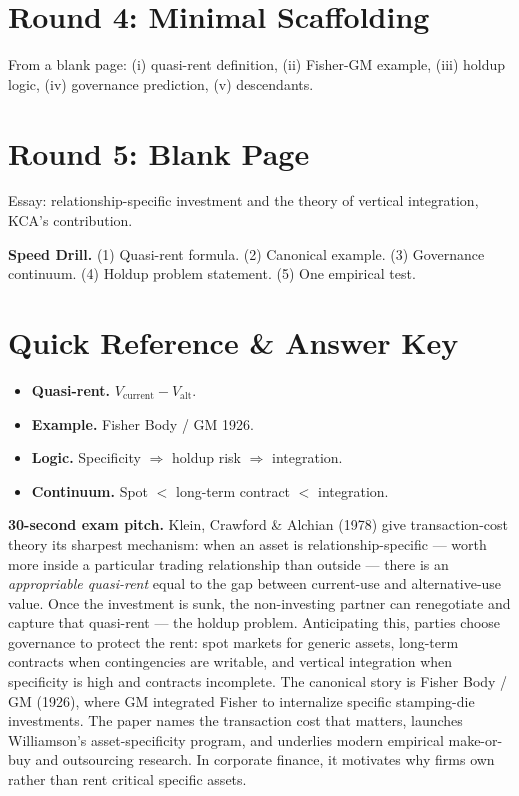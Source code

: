 \documentclass[11pt]{article}
\begin{document}
\section*{Round 4: Minimal Scaffolding}
From a blank page: (i) quasi-rent definition, (ii) Fisher-GM example, (iii) holdup logic, (iv) governance prediction, (v) descendants.

\section*{Round 5: Blank Page}
Essay: relationship-specific investment and the theory of vertical integration, KCA's contribution.

\vspace{6pt}
\begin{drillbox}
\textbf{Speed Drill.} (1) Quasi-rent formula. (2) Canonical example. (3) Governance continuum. (4) Holdup problem statement. (5) One empirical test.
\end{drillbox}

\section*{Quick Reference \& Answer Key}
\begin{answerbox}
\begin{itemize}
\item \textbf{Quasi-rent.} $V_{\text{current}} - V_{\text{alt}}$.
\item \textbf{Example.} Fisher Body / GM 1926.
\item \textbf{Logic.} Specificity $\Rightarrow$ holdup risk $\Rightarrow$ integration.
\item \textbf{Continuum.} Spot $<$ long-term contract $<$ integration.
\end{itemize}
\end{answerbox}

\begin{keybox}
\textbf{30-second exam pitch.} Klein, Crawford \& Alchian (1978) give transaction-cost theory its sharpest mechanism: when an asset is relationship-specific --- worth more inside a particular trading relationship than outside --- there is an \emph{appropriable quasi-rent} equal to the gap between current-use and alternative-use value. Once the investment is sunk, the non-investing partner can renegotiate and capture that quasi-rent --- the holdup problem. Anticipating this, parties choose governance to protect the rent: spot markets for generic assets, long-term contracts when contingencies are writable, and vertical integration when specificity is high and contracts incomplete. The canonical story is Fisher Body / GM (1926), where GM integrated Fisher to internalize specific stamping-die investments. The paper names the transaction cost that matters, launches Williamson's asset-specificity program, and underlies modern empirical make-or-buy and outsourcing research. In corporate finance, it motivates why firms own rather than rent critical specific assets.
\end{keybox}
\end{document}
